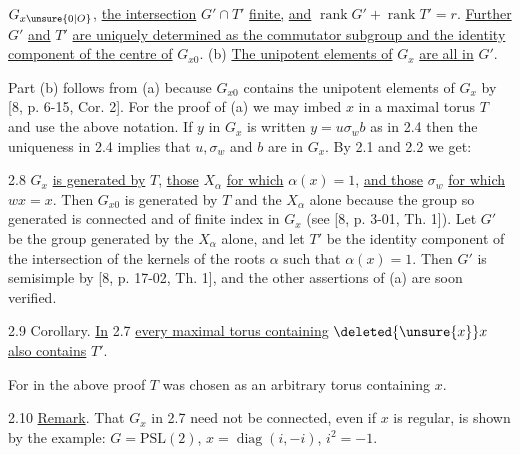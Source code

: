 

$G_{x\unsure{0|O}}$, \uline{the intersection} $G'\cap T'$ \uline{finite,} \uline{and} $\operatorname{rank}G'+\operatorname{rank}T'=r$. \uline{Further}
$G'$ \uline{and} $T'$ \uline{are uniquely determined as the commutator subgroup and the
identity component of the centre of} $G_{x0}$. (b) \uline{The unipotent elements of}
$G_x$ \uline{are all in} $G'$.

Part (b) follows from (a) because $G_{x0}$ contains the unipotent elements
of $G_x$ by [8, p. 6-15, Cor. 2]. For the proof of (a) we may imbed $x$ in a
maximal torus $T$ and use the above notation. If $y$ in $G_x$ is written
$y=u\sigma_w b$ as in 2.4 then the uniqueness in 2.4 implies that $u,\sigma_w$ and $b$
are in $G_x$. By 2.1 and 2.2 we get:

2.8 \quad$G_x$ \uline{is generated by} $T$, \uline{those} $X_\alpha$ \uline{for which} $\alpha(x)=1$, \uline{and those}
$\sigma_w$ \uline{for which} $wx=x$. Then $G_{x0}$ is generated by $T$ and the $X_\alpha$ alone
because the group so generated is connected and of finite index in $G_x$ (see
[8, p. 3-01, Th. 1]). Let $G'$ be the group generated by the $X_\alpha$ alone,
and let $T'$ be the identity component of the intersection of the kernels of
the roots $\alpha$ such that $\alpha(x)=1$. Then $G'$ is semisimple by [8, p. 17-02,
Th. 1], and the other assertions of (a) are soon verified.

2.9 \quad Corollary. \uline{In} 2.7 \uline{every maximal torus containing} $\deleted{\unsure{x}}x$ \uline{also contains}
$T'$.

For in the above proof $T$ was chosen as an arbitrary torus containing $x$.

2.10 \quad\uline{Remark}. That $G_x$ in 2.7 need not be connected, even if $x$ is
regular, is shown by the example: $G=\mathrm{PSL}(2)$, $x=\operatorname{diag}(i,-i)$, $i^2=-1$.




